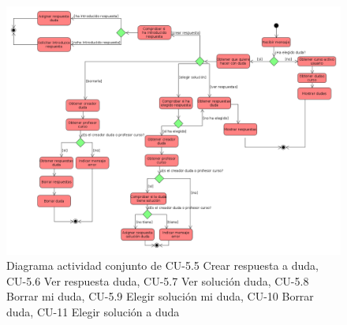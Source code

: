         \begin{figure}[!ht] %
\centering
\includegraphics[scale=0.2]{imagenes/diagramas/actividad/operaciones_dudaa.png}  %

\caption{Diagrama actividad conjunto de  CU-5.5 Crear respuesta a duda, CU-5.6 Ver respuesta duda, CU-5.7 Ver solución duda, CU-5.8 Borrar mi duda, CU-5.9 Elegir solución mi duda, CU-10 Borrar duda, CU-11 Elegir solución a duda}\label{figura151}
\end{figure}

